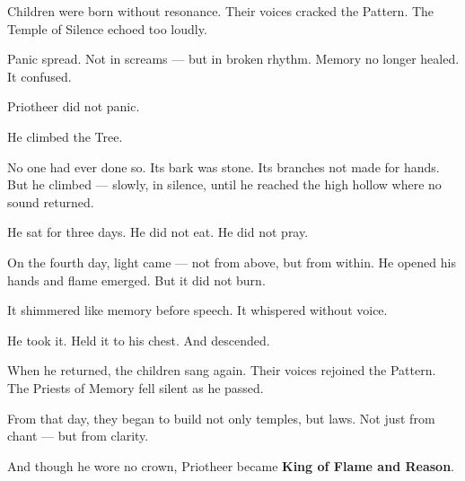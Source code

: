\documentclass[10pt]{article}
\begin{document}
Children were born without resonance.  
Their voices cracked the Pattern.  
The Temple of Silence echoed too loudly.

Panic spread.  
Not in screams — but in broken rhythm.  
Memory no longer healed. It confused.

Priotheer did not panic.

He climbed the Tree.

No one had ever done so.  
Its bark was stone. Its branches not made for hands.  
But he climbed — slowly, in silence, until he reached the high hollow where no sound returned.

He sat for three days.  
He did not eat.  
He did not pray.

On the fourth day, light came — not from above, but from within.  
He opened his hands and flame emerged.  
But it did not burn.

It shimmered like memory before speech.  
It whispered without voice.

He took it.  
Held it to his chest.  
And descended.

When he returned, the children sang again.  
Their voices rejoined the Pattern.  
The Priests of Memory fell silent as he passed.

From that day, they began to build not only temples, but laws.  
Not just from chant — but from clarity.

And though he wore no crown, Priotheer became  
\textbf{King of Flame and Reason}.
\end{document}
